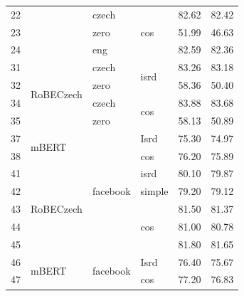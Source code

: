 \begin{table}[]
{\begin{tabular}{|l|l|l|l||ll|}
22 &                            & czech                     & \multirow{3}{*}{cos}  & 82.62   & 82.42 \\ \cline{1-1} \cline{3-3} \cline{5-6}
23 &                            & zero                      &                       & 51.99   & 46.63 \\ \cline{1-1} \cline{3-3} \cline{5-6}
24 &                            & eng                       &                       & 82.59   & 82.36 \\ \hline
31 & \multirow{4}{*}{RoBECzech} & czech                     & \multirow{2}{*}{isrd} & 83.26   & 83.18 \\ \cline{1-1} \cline{3-3} \cline{5-6}
32 &                            & zero                      &                       & 58.36   & 50.40 \\ \cline{1-1} \cline{3-6}
34 &                            & czech                     & \multirow{2}{*}{cos}  & 83.88   & 83.68 \\ \cline{1-1} \cline{3-3} \cline{5-6}
35 &                            & zero                      &                       & 58.13   & 50.89 \\ \hline
37 & \multirow{2}{*}{mBERT}     & \multirow{7}{*}{facebook} & Isrd                  & 75.30   & 74.97 \\ \cline{1-1} \cline{4-6}
38 &                            &                           & cos                   & 76.20   & 75.89 \\ \cline{1-2} \cline{4-6}
41 & \multirow{5}{*}{RoBECzech} &                           & isrd                  & 80.10   & 79.87 \\ \cline{1-1} \cline{4-6}
42 &                            &                           & simple                & 79.20   & 79.12 \\ \cline{1-1} \cline{4-6}
43 &                            &                           & \multirow{3}{*}{cos}  & 81.50   & 81.37 \\ \cline{1-1} \cline{5-6}
44 &                            &                           &                       & 81.00   & 80.78 \\ \cline{1-1} \cline{5-6}
45 &                            &                           &                       & 81.80   & 81.65 \\ \hline
46 & \multirow{2}{*}{mBERT}     & \multirow{4}{*}{facebook} & Isrd                  & 76.40   & 75.67 \\ \cline{1-1} \cline{4-6}
47 &                            &                           & cos                   & 77.20   & 76.83 \\ \cline{1-2} \cline{4-6}

\end{tabular}}
\end{table}

